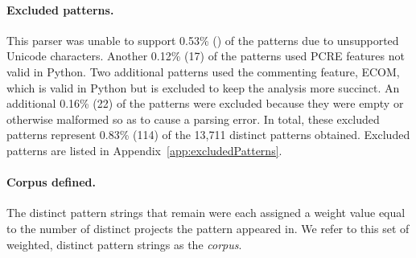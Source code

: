 \paragraph{Excluded patterns.} This parser was unable to support 0.53\% () of the patterns due to unsupported Unicode characters.
Another 0.12\% (17) of the patterns used PCRE features not valid in Python.  Two additional patterns used the commenting feature, ECOM, which is valid in Python but is excluded to keep the analysis more succinct.  An additional 0.16\% (22) of the patterns were excluded because they were empty or otherwise malformed so as to cause a parsing error.  In total, these excluded patterns represent 0.83\% (114) of the 13,711 distinct patterns obtained.  Excluded patterns are listed in Appendix~\ref{app:excludedPatterns}.

\paragraph{Corpus defined.} The  distinct pattern strings that remain were each assigned a weight value equal to the number of distinct projects the pattern appeared in.  We  refer to this set of weighted, distinct pattern strings as the \emph{corpus}.
